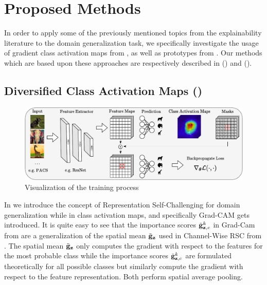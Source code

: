 \chapter{Proposed Methods}

In order to apply some of the previously mentioned topics from the explainability literature to the domain generalization task,  we specifically investigate the usage of gradient class activation maps from , as well as prototypes from . Our methods which are based upon these approaches are respectively described in  (\divcam) and  (\prodrop). 

\section{Diversified Class Activation Maps (\divcam)}
\label{sec:divcam}

\begin{figure}[t]
    \centering
    \includegraphics[width=\textwidth]{Figures/Chapter4/model_figure-cropped.pdf}
    \caption{Visualization of the \divcam training process}
    \label{fig:divcam-overview}
\end{figure}


In  we introduce the concept of Representation Self-Challenging for domain generalization while in  class activation maps, and specifically Grad-CAM gets introduced. It is quite easy to see that the importance scores $ \Tilde{\mathbf{g}}_{\mathbf{z},c}^k$ in Grad-Cam from  are a generalization of the spatial mean $\Tilde{\mathbf{g}}_\mathbf{z}$ used in Channel-Wise RSC from . The spatial mean $\Tilde{\mathbf{g}}_\mathbf{z}$ only computes the gradient with respect to the features for the most probable class while the importance scores $ \Tilde{\mathbf{g}}_{\mathbf{z},c}^k$ are formulated theoretically for all possible classes but similarly compute the gradient with respect to the feature representation. Both perform spatial average pooling.  

